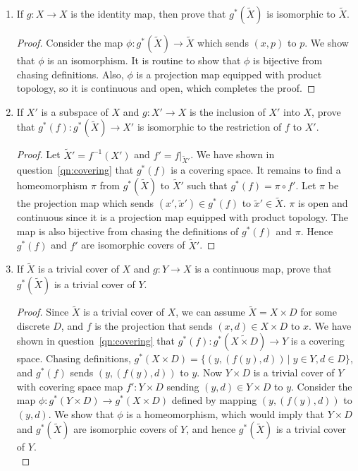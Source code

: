 \documentclass{article}
\begin{document}
\begin{enumerate}
\begin{enumerate}
      \item If $g:X\rightarrow X$ is the identity map, then prove that
        $g^*(\tilde{X})$ is isomorphic to $\tilde{X}$.
        \begin{proof}
          Consider the map $\phi:g^*(\tilde{X})\rightarrow\tilde{X}$ which
          sends $(x,p)$ to $p$. We show that $\phi$ is an isomorphism.
          It is routine to show that $\phi$ is bijective from chasing
          definitions. Also, $\phi$ is a projection map equipped with
          product topology, so it is continuous and open, which completes
          the proof.
        \end{proof}

      \item If $X'$ is a subspace of $X$ and $g:X'\rightarrow X$ is the
        inclusion of $X'$ into $X$, prove that
        $g^*(f):g^*(\tilde{X})\rightarrow X'$ is isomorphic to the
        restriction of $f$ to $X'$.

        \begin{proof}
          Let $\tilde{X}'=f^{-1}(X')$ and $f'=f|_{\tilde{X}'}$. We have
          shown in question~\ref{qn:covering} that $g^*(f)$ is a covering
          space. It remains to find a homeomorphism $\pi$ from
          $g^*(\tilde{X})$ to $\tilde{X}'$ such that $g^*(f)=\pi\circ f'$.
          Let $\pi$ be the projection map which sends $(x',\tilde{x}')\in
          g^*(f)$ to $\tilde{x}'\in\tilde{X}$. $\pi$ is open and continuous
          since it is a projection map equipped with product topology. The
          map is also bijective from chasing the definitions of $g^*(f)$
          and $\pi$. Hence $g^*(f)$ and $f'$ are isomorphic covers of
          $\tilde{X}'$.
        \end{proof}

      \item If $\tilde{X}$ is a trivial cover of $X$ and $g:Y\rightarrow X$
        is a continuous map, prove that $g^*(\tilde{X})$ is a trivial cover
        of $Y$.

        \begin{proof}
          Since $\tilde{X}$ is a trivial cover of $X$, we can assume
          $\tilde{X}=X\times D$ for some discrete $D$, and $f$ is the
          projection that sends $(x,d)\in X\times D$ to $x$. We have shown
          in question~\ref{qn:covering} that $g^*(f):g^*(\tilde{X\times
          D})\rightarrow Y$ is a covering space. Chasing definitions,
          $g^*(X\times D)=\{(y,(f(y),d))\,|\; y\in Y, d\in D\}$, and
          $g^*(f)$ sends $(y,(f(y),d))$ to $y$. Now $Y\times D$ is a
          trivial cover of $Y$ with covering space map $f':Y\times D$
          sending $(y,d)\in Y\times D$ to $y$. Consider the map
          $\phi:g^*(Y\times D)\rightarrow g^*(X\times D)$ defined by
          mapping $(y,(f(y),d))$ to $(y,d)$. We show that $\phi$ is a
          homeomorphism, which would imply that $Y\times D$ and
          $g^*(\tilde{X})$ are isomorphic covers of $Y$, and hence
          $g^*(\tilde{X})$ is a trivial cover of $Y$. \\


\end{proof}
\end{enumerate}
\end{enumerate}
\end{document}
